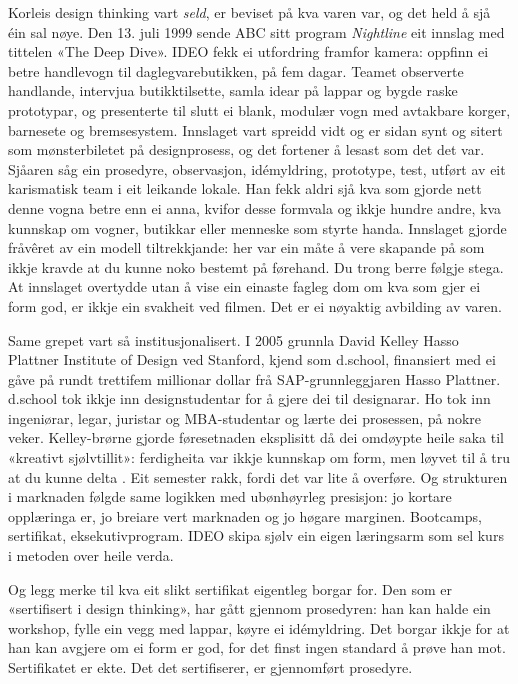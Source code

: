 Korleis design thinking vart \emph{seld}, er beviset på kva varen var, og det held å sjå éin sal nøye. Den 13. juli 1999 sende ABC sitt program \textit{Nightline} eit innslag med tittelen «The Deep Dive». IDEO fekk ei utfordring framfor kamera: oppfinn ei betre handlevogn til daglegvarebutikken, på fem dagar. Teamet observerte handlande, intervjua butikktilsette, samla idear på lappar og bygde raske prototypar, og presenterte til slutt ei blank, modulær vogn med avtakbare korger, barnesete og bremsesystem. Innslaget vart spreidd vidt og er sidan synt og sitert som mønsterbiletet på designprosess, og det fortener å lesast som det det var. Sjåaren såg ein prosedyre, observasjon, idémyldring, prototype, test, utført av eit karismatisk team i eit leikande lokale. Han fekk aldri sjå kva som gjorde nett denne vogna betre enn ei anna, kvifor desse formvala og ikkje hundre andre, kva kunnskap om vogner, butikkar eller menneske som styrte handa. Innslaget gjorde fråvêret av ein modell tiltrekkjande: her var ein måte å vere skapande på som ikkje kravde at du kunne noko bestemt på førehand. Du trong berre følgje stega. At innslaget overtydde utan å vise ein einaste fagleg dom om kva som gjer ei form god, er ikkje ein svakheit ved filmen. Det er ei nøyaktig avbilding av varen.

Same grepet vart så institusjonalisert. I 2005 grunnla David Kelley Hasso Plattner Institute of Design ved Stanford, kjend som d.school, finansiert med ei gåve på rundt trettifem millionar dollar frå SAP-grunnleggjaren Hasso Plattner. d.school tok ikkje inn designstudentar for å gjere dei til designarar. Ho tok inn ingeniørar, legar, juristar og MBA-studentar og lærte dei prosessen, på nokre veker. Kelley-brørne gjorde føresetnaden eksplisitt då dei omdøypte heile saka til «kreativt sjølvtillit»: ferdigheita var ikkje kunnskap om form, men løyvet til å tru at du kunne delta \autocite{kelley2013}. Eit semester rakk, fordi det var lite å overføre. Og strukturen i marknaden følgde same logikken med ubønhøyrleg presisjon: jo kortare opplæringa er, jo breiare vert marknaden og jo høgare marginen. Bootcamps, sertifikat, eksekutivprogram. IDEO skipa sjølv ein eigen læringsarm som sel kurs i metoden over heile verda.

Og legg merke til kva eit slikt sertifikat eigentleg borgar for. Den som er «sertifisert i design thinking», har gått gjennom prosedyren: han kan halde ein workshop, fylle ein vegg med lappar, køyre ei idémyldring. Det borgar ikkje for at han kan avgjere om ei form er god, for det finst ingen standard å prøve han mot. Sertifikatet er ekte. Det det sertifiserer, er gjennomført prosedyre.

